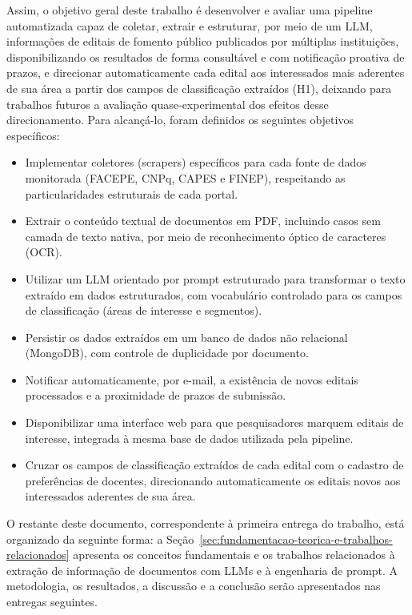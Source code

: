 \documentclass[12pt]{article}
\begin{document}
  Assim, o objetivo geral deste trabalho é desenvolver e avaliar uma pipeline automatizada capaz de coletar, extrair e estruturar, por meio de um LLM, informações de editais de fomento público publicados por múltiplas instituições, disponibilizando os resultados de forma consultável e com notificação proativa de prazos, e direcionar automaticamente cada edital aos interessados mais aderentes de sua área a partir dos campos de classificação extraídos (H1), deixando para trabalhos futuros a avaliação quase-experimental dos efeitos desse direcionamento. Para alcançá-lo, foram definidos os seguintes objetivos específicos:
  \begin{itemize}
  \item Implementar coletores (scrapers) específicos para cada fonte de dados monitorada (FACEPE, CNPq, CAPES e FINEP), respeitando as particularidades estruturais de cada portal.
  \item Extrair o conteúdo textual de documentos em PDF, incluindo casos sem camada de texto nativa, por meio de reconhecimento óptico de caracteres (OCR).
  \item Utilizar um LLM orientado por prompt estruturado para transformar o texto extraído em dados estruturados, com vocabulário controlado para os campos de classificação (áreas de interesse e segmentos).
  \item Persistir os dados extraídos em um banco de dados não relacional (MongoDB), com controle de duplicidade por documento.
  \item Notificar automaticamente, por e-mail, a existência de novos editais processados e a proximidade de prazos de submissão.
  \item Disponibilizar uma interface web para que pesquisadores marquem editais de interesse, integrada à mesma base de dados utilizada pela pipeline.
  \item Cruzar os campos de classificação extraídos de cada edital com o cadastro de preferências de docentes, direcionando automaticamente os editais novos aos interessados aderentes de sua área.
  \end{itemize}

  O restante deste documento, correspondente à primeira entrega do trabalho, está organizado da seguinte forma: a Seção~\ref{sec:fundamentacao-teorica-e-trabalhos-relacionados} apresenta os conceitos fundamentais e os trabalhos relacionados à extração de informação de documentos com LLMs e à engenharia de prompt. A metodologia, os resultados, a discussão e a conclusão serão apresentados nas entregas seguintes.
\end{document}
